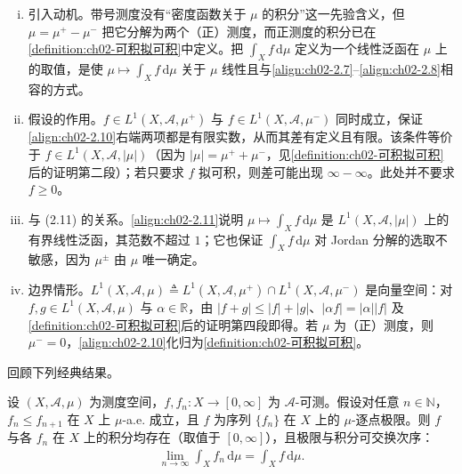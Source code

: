 \documentclass[../../main.tex]{subfiles}%
\begin{document}
\begin{remark}\label{remark:ch02-带号测度积分动机}
\begin{enumerate}[(i)]
\item 引入动机。带号测度没有“密度函数关于 $\mu$ 的积分”这一先验含义，但 $\mu=\mu^+-\mu^-$ 把它分解为两个（正）测度，而正测度的积分已在\cref{definition:ch02-可积拟可积}中定义。把 $\int_Xf\,\mathrm{d}\mu$ 定义为一个线性泛函在 $\mu$ 上的取值，是使 $\mu\mapsto\int_Xf\,\mathrm{d}\mu$ 关于 $\mu$ 线性且与\eqref{align:ch02-2.7}--\eqref{align:ch02-2.8}相容的方式。
\item 假设的作用。$f\in L^1(X,\mathscr A,\mu^+)$ 与 $f\in L^1(X,\mathscr A,\mu^-)$ 同时成立，保证\eqref{align:ch02-2.10}右端两项都是有限实数，从而其差有定义且有限。该条件等价于 $f\in L^1(X,\mathscr A,|\mu|)$（因为 $|\mu|=\mu^++\mu^-$，见\cref{definition:ch02-可积拟可积}后的证明第二段）；若只要求 $f$ 拟可积，则差可能出现 $\infty-\infty$。此处并不要求 $f\geqslant0$。
\item 与 (2.11) 的关系。\eqref{align:ch02-2.11}说明 $\mu\mapsto\int_Xf\,\mathrm{d}\mu$ 是 $L^1(X,\mathscr A,|\mu|)$ 上的有界线性泛函，其范数不超过 $1$；它也保证 $\int_Xf\,\mathrm{d}\mu$ 对 Jordan 分解的选取不敏感，因为 $\mu^\pm$ 由 $\mu$ 唯一确定。
\item 边界情形。$L^1(X,\mathscr A,\mu)\triangleq L^1(X,\mathscr A,\mu^+)\cap L^1(X,\mathscr A,\mu^-)$ 是向量空间：对 $f,g\in L^1(X,\mathscr A,\mu)$ 与 $\alpha\in\mathbb R$，由 $|f+g|\leqslant|f|+|g|$、$|\alpha f|=|\alpha||f|$ 及\cref{definition:ch02-可积拟可积}后的证明第四段即得。若 $\mu$ 为（正）测度，则 $\mu^-=0$，\eqref{align:ch02-2.10}化归为\cref{definition:ch02-可积拟可积}。
\end{enumerate}
\end{remark}
回顾下列经典结果。

\begin{theorem}\label{theorem:ch02-BeppoLevi}
设 $(X,\mathscr A,\mu)$ 为测度空间，$f,f_n:X\to[0,\infty]$ 为 $\mathscr A$-可测。假设对任意 $n\in\mathbb N$，$f_n\leqslant f_{n+1}$ 在 $X$ 上 $\mu$-a.e. 成立，且 $f$ 为序列 $\{f_n\}$ 在 $X$ 上的 $\mu$-逐点极限。则 $f$ 与各 $f_n$ 在 $X$ 上的积分均存在（取值于 $[0,\infty]$），且极限与积分可交换次序：
\begin{align*}
\lim_{n\to\infty}\int_Xf_n\,\mathrm{d}\mu=\int_Xf\,\mathrm{d}\mu.
\end{align*}
\end{theorem}
\end{document}
